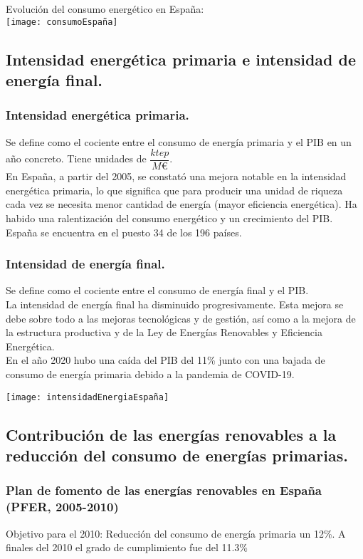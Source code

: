 			Evolución del consumo energético en España:\\
			\texttt{[image: consumoEspaña]}
		
		\subsection{Intensidad energética primaria e intensidad de energía final.}
			\subsubsection{Intensidad energética primaria.}
				Se define como el cociente entre el consumo de energía primaria y el PIB en un año concreto. Tiene unidades de $\dfrac{\textit{ktep}}{\textit{M€}}$.\\
				\indent En España, a partir del 2005, se constató una mejora notable en la
				intensidad energética primaria, lo que significa que para producir una
				unidad de riqueza cada vez se necesita menor cantidad de energía (mayor
				eficiencia energética). Ha habido una ralentización del consumo energético y un
				crecimiento del PIB. España se encuentra en el puesto 34 de los 196 países.
				
			\subsubsection{Intensidad de energía final.}
				Se define como el cociente entre el consumo de energía final y el PIB.\\
				\indent La intensidad de energía final ha disminuido progresivamente. Esta mejora se debe sobre todo
				a las mejoras tecnológicas y de gestión, así como a la mejora de la estructura productiva y de la Ley de Energías Renovables y Eficiencia Energética.\\
				\indent En el año 2020 hubo una caída del PIB del 11\% junto con una bajada de consumo de energía primaria debido a la pandemia de COVID-19.
				
			\texttt{[image: intensidadEnergiaEspaña]}
		
		\subsection{Contribución de las energías renovables a la reducción del consumo de energías primarias.}
			\subsubsection{Plan de fomento de las energías renovables en España (PFER, 2005-2010)}
				Objetivo para el 2010: Reducción del consumo de energía primaria un 12\%. A finales del 2010 el
				grado de cumplimiento fue del 11.3\%
			
